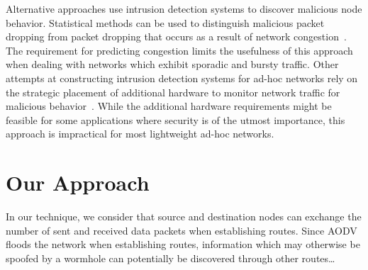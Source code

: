 \documentclass[12pt,a4paper]{report}
\begin{document}
Alternative approaches use intrusion detection systems to discover malicious node behavior. Statistical methods can be used to distinguish malicious packet dropping from packet dropping that occurs as a result of network congestion~\cite{1258776}. The requirement for predicting congestion limits the usefulness of this approach when dealing with networks which exhibit sporadic and bursty traffic. Other attempts at constructing intrusion detection systems for ad-hoc networks rely on the strategic placement of additional hardware to monitor network traffic for malicious behavior~\cite{Tseng:2003:SID:986858.986876}. While the additional hardware requirements might be feasible for some applications where security is of the utmost importance, this approach is impractical for most lightweight ad-hoc networks.

\section{Our Approach}
In our technique, we consider that source and destination nodes can exchange the number of sent and received data packets when establishing routes. Since AODV floods the network when establishing routes, information which may otherwise be spoofed by a wormhole can potentially be discovered through other routes\ldots



\end{document}
